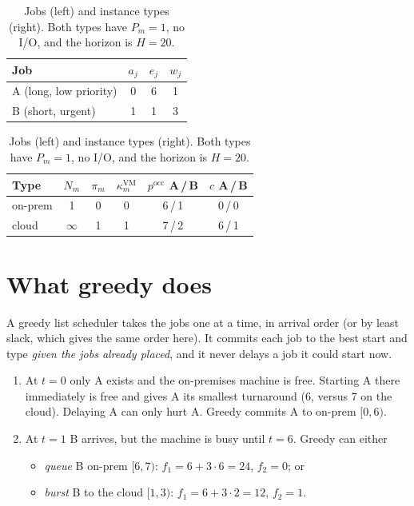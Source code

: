 \documentclass[11pt,a4paper]{article}
\begin{document}
\begin{table}[h]
\centering
\begin{tabular}{lccc}
\toprule
Job & $a_j$ & $e_j$ & $w_j$ \\
\midrule
A (long, low priority) & 0 & 6 & 1 \\
B (short, urgent)      & 1 & 1 & 3 \\
\bottomrule
\end{tabular}
\hspace{1.5em}
\begin{tabular}{lccccc}
\toprule
Type & $N_m$ & $\pi_m$ & $\kappa^{\mathrm{VM}}_m$ & $p^{\mathrm{occ}}$ A\,/\,B & $c$ A\,/\,B \\
\midrule
on-prem & 1        & 0 & 0 & 6\,/\,1 & 0\,/\,0 \\
cloud   & $\infty$ & 1 & 1 & 7\,/\,2 & 6\,/\,1 \\
\bottomrule
\end{tabular}
\caption{Jobs (left) and instance types (right). Both types have $P_m=1$, no
I/O, and the horizon is $H=20$.}
\end{table}

\section{What greedy does}

A greedy list scheduler takes the jobs one at a time, in arrival order (or by
least slack, which gives the same order here). It commits each job to the best
start and type \emph{given the jobs already placed}, and it never delays a job
it could start now.

\begin{enumerate}
  \item At $t=0$ only A exists and the on-premises machine is free. Starting A
        there immediately is free and gives A its smallest turnaround (6,
        versus 7 on the cloud). Delaying A can only hurt A. Greedy commits
        A to on-prem $[0,6)$.
  \item At $t=1$ B arrives, but the machine is busy until $t=6$. Greedy can
        either
        \begin{itemize}
          \item \emph{queue} B on-prem $[6,7)$: $f_1=6+3\cdot 6=24$, $f_2=0$; or
          \item \emph{burst} B to the cloud $[1,3)$: $f_1=6+3\cdot2=12$, $f_2=1$.
        \end{itemize}
\end{enumerate}
\end{document}
